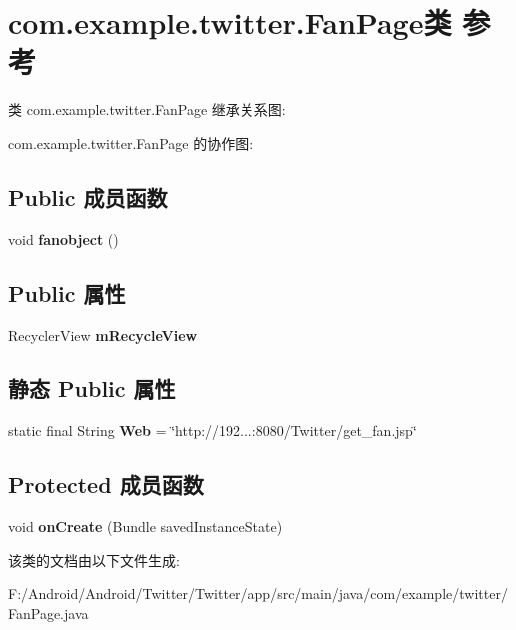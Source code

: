\hypertarget{classcom_1_1example_1_1twitter_1_1_fan_page}{}\section{com.\+example.\+twitter.\+Fan\+Page类 参考}
\label{classcom_1_1example_1_1twitter_1_1_fan_page}


类 com.\+example.\+twitter.\+Fan\+Page 继承关系图\+:


com.\+example.\+twitter.\+Fan\+Page 的协作图\+:
\subsection*{Public 成员函数}
\begin{DoxyCompactItemize}
\item 
\mbox{\label{classcom_1_1example_1_1twitter_1_1_fan_page_a6cd7914bfd1cc3964794e0268098407a}} 
void {\bfseries fanobject} ()
\end{DoxyCompactItemize}
\subsection*{Public 属性}
\begin{DoxyCompactItemize}
\item 
\mbox{\label{classcom_1_1example_1_1twitter_1_1_fan_page_acf43807490892daf8387d738e2376a00}} 
Recycler\+View {\bfseries m\+Recycle\+View}
\end{DoxyCompactItemize}
\subsection*{静态 Public 属性}
\begin{DoxyCompactItemize}
\item 
\mbox{\label{classcom_1_1example_1_1twitter_1_1_fan_page_ae874a18b2b38a8d37b5921ac8ab75982}} 
static final String {\bfseries Web} = \char`\"{}http\+://192...\+:8080/Twitter/get\+\_\+fan.\+jsp\char`\"{}
\end{DoxyCompactItemize}
\subsection*{Protected 成员函数}
\begin{DoxyCompactItemize}
\item 
\mbox{\label{classcom_1_1example_1_1twitter_1_1_fan_page_a2965d250527f85a8be36c385ef44b7e9}} 
void {\bfseries on\+Create} (Bundle saved\+Instance\+State)
\end{DoxyCompactItemize}


该类的文档由以下文件生成\+:\begin{DoxyCompactItemize}
\item 
F\+:/\+Android/\+Android/\+Twitter/\+Twitter/app/src/main/java/com/example/twitter/Fan\+Page.\+java\end{DoxyCompactItemize}
